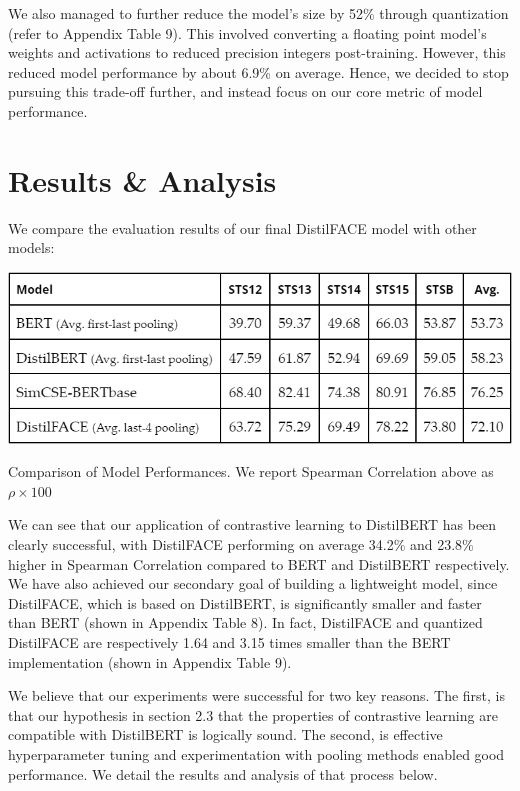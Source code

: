 \documentclass[10pt,twocolumn,letterpaper]{article}
\begin{document}
We also managed to further reduce the model's size by 52\% through quantization (refer to Appendix Table 9). This involved converting a floating point model’s weights and activations to reduced precision integers post-training.  However, this reduced model performance by about 6.9\% on average. Hence, we decided to stop pursuing this trade-off further, and instead focus on our core metric of model performance.


\section{Results \& Analysis}

We compare the evaluation results of our final DistilFACE model with other models:

\begin{table}[hbt!]
\centering
\includegraphics[scale=0.4]{images/Results-Compare-Models.png}
\caption{Comparison of Model Performances. We report Spearman Correlation above as \(\rho \times 100\)}
\label{fig:short}
\end{table}

 We can see that our application of contrastive learning to DistilBERT has been clearly successful, with DistilFACE performing on average 34.2\% and 23.8\% higher in Spearman Correlation compared to BERT and DistilBERT respectively. We have also achieved our secondary goal of building a lightweight model, since DistilFACE, which is based on DistilBERT, is significantly smaller and faster than BERT \cite{1910.01108} (shown in Appendix Table 8).  In fact, DistilFACE and quantized DistilFACE are respectively 1.64 and 3.15 times smaller than the BERT implementation (shown in Appendix Table 9). 

We believe that our experiments were successful for two key reasons. The first, is that our hypothesis in section 2.3 that the properties of contrastive learning are compatible with DistilBERT is logically sound. The second, is effective hyperparameter tuning and experimentation with pooling methods enabled good performance. We detail the results and analysis of that process below.
\end{document}
